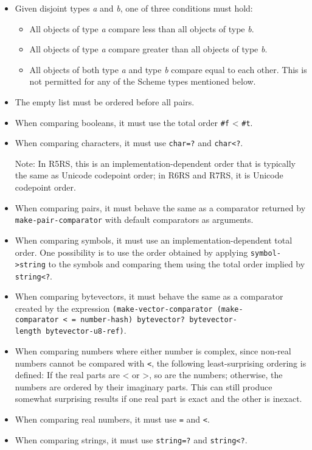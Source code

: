 \begin{itemize}
\item
  Given disjoint types \emph{a} and \emph{b}, one of three conditions
  must hold:

  \begin{itemize}
  \tightlist
  \item
    All objects of type \emph{a} compare less than all objects of type
    \emph{b}.
  \item
    All objects of type \emph{a} compare greater than all objects of
    type \emph{b}.
  \item
    All objects of both type \emph{a} and type \emph{b} compare equal to
    each other. This is not permitted for any of the Scheme types
    mentioned below.
  \end{itemize}
\item
  The empty list must be ordered before all pairs.
\item
  When comparing booleans, it must use the total order \texttt{\#f}
  \textless{} \texttt{\#t}.
\item
  When comparing characters, it must use \texttt{char=?} and
  \texttt{char\textless{}?}.

  Note: In R5RS, this is an implementation-dependent order that is
  typically the same as Unicode codepoint order; in R6RS and R7RS, it is
  Unicode codepoint order.
\item
  When comparing pairs, it must behave the same as a comparator returned
  by \texttt{make-pair-comparator} with default comparators as
  arguments.
\item
  When comparing symbols, it must use an implementation-dependent total
  order. One possibility is to use the order obtained by applying
  \texttt{symbol-\textgreater{}string} to the symbols and comparing them
  using the total order implied by \texttt{string\textless{}?}.
\item
  When comparing bytevectors, it must behave the same as a comparator
  created by the expression
  \texttt{(make-vector-comparator\ (make-comparator\ \textless{}\ =\ number-hash)\ bytevector?\ bytevector-length\ bytevector-u8-ref)}.
\item
  When comparing numbers where either number is complex, since non-real
  numbers cannot be compared with \texttt{\textless{}}, the following
  least-surprising ordering is defined: If the real parts are
  \textless{} or \textgreater{}, so are the numbers; otherwise, the
  numbers are ordered by their imaginary parts. This can still produce
  somewhat surprising results if one real part is exact and the other is
  inexact.
\item
  When comparing real numbers, it must use \texttt{=} and
  \texttt{\textless{}}.
\item
  When comparing strings, it must use \texttt{string=?} and
  \texttt{string\textless{}?}.


\end{itemize}
